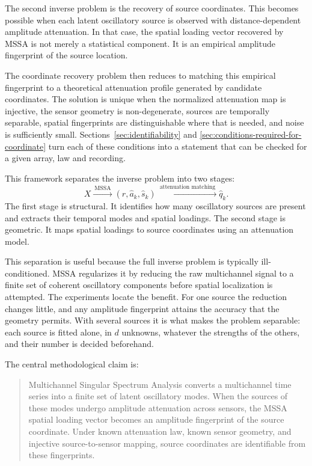 \documentclass{article}
\begin{document}
The second inverse problem is the recovery of source coordinates. This becomes possible when each latent oscillatory source is observed with distance-dependent amplitude attenuation. In that case, the spatial loading vector recovered by MSSA is not merely a statistical component. It is an empirical amplitude fingerprint of the source location.

The coordinate recovery problem then reduces to matching this empirical fingerprint to a theoretical attenuation profile generated by candidate coordinates. The solution is unique when the normalized attenuation map is injective, the sensor geometry is non-degenerate, sources are temporally separable, spatial fingerprints are distinguishable where that is needed, and noise is sufficiently small. Sections~\ref{sec:identifiability} and \ref{sec:conditions-required-for-coordinate} turn each of these conditions into a statement that can be checked for a given array, law and recording.

This framework separates the inverse problem into two stages: \[
X \xrightarrow{\ \mathrm{MSSA}\ } (\widehat{r}, \widehat{a}_k, \widehat{s}_k) \xrightarrow{\ \text{attenuation matching}\ } \widehat{q}_k .
\] The first stage is structural. It identifies how many oscillatory sources are present and extracts their temporal modes and spatial loadings. The second stage is geometric. It maps spatial loadings to source coordinates using an attenuation model.

This separation is useful because the full inverse problem is typically ill-conditioned. MSSA regularizes it by reducing the raw multichannel signal to a finite set of coherent oscillatory components before spatial localization is attempted. The experiments locate the benefit. For one source the reduction changes little, and any amplitude fingerprint attains the accuracy that the geometry permits. With several sources it is what makes the problem separable: each source is fitted alone, in $d$ unknowns, whatever the strengths of the others, and their number is decided beforehand.

The central methodological claim is:

\begin{quote}
Multichannel Singular Spectrum Analysis converts a multichannel time series into a finite set of latent oscillatory modes. When the sources of these modes undergo amplitude attenuation across sensors, the MSSA spatial loading vector becomes an amplitude fingerprint of the source coordinate. Under known attenuation law, known sensor geometry, and injective source-to-sensor mapping, source coordinates are identifiable from these fingerprints.
\end{quote}
\end{document}
